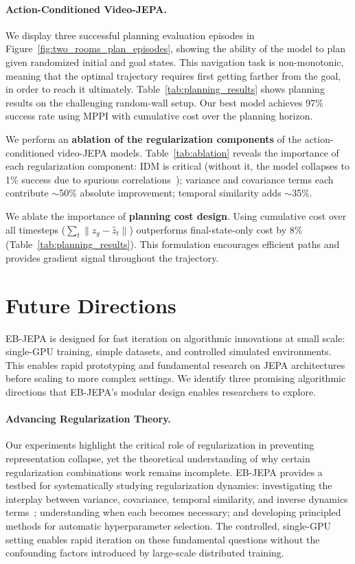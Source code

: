 \documentclass{article}
\begin{document}
\paragraph{Action-Conditioned Video-JEPA.}
We display three successful planning evaluation episodes in Figure~\ref{fig:two_rooms_plan_episodes}, showing the ability of the model to plan given randomized initial and goal states. This navigation task is non-monotonic, meaning that the optimal trajectory requires first getting farther from the goal, in order to reach it ultimately.
Table~\ref{tab:planning_results} shows planning results on the challenging random-wall setup.
Our best model achieves 97\% success rate using MPPI with cumulative cost over the planning horizon.

We perform an \textbf{ablation of the regularization components} of the action-conditioned video-JEPA models. Table~\ref{tab:ablation} reveals the importance of each regularization component: IDM is critical (without it, the model collapses to 1\% success due to spurious correlations~\citep{sobal2022jepaslowfeatures}); variance and covariance terms each contribute $\sim$50\% absolute improvement; temporal similarity adds $\sim$35\%.

We ablate the importance of \textbf{planning cost design}. Using cumulative cost over all timesteps ($\sum_t \|z_g - \hat{z}_t\|$) outperforms final-state-only cost by 8\% (Table~\ref{tab:planning_results}).
This formulation encourages efficient paths and provides gradient signal throughout the trajectory.

\section{Future Directions}

EB-JEPA is designed for fast iteration on algorithmic innovations at small scale: single-GPU training, simple datasets, and controlled simulated environments.
This enables rapid prototyping and fundamental research on JEPA architectures before scaling to more complex settings.
We identify three promising algorithmic directions that EB-JEPA's modular design enables researchers to explore.

\paragraph{Advancing Regularization Theory.}
Our experiments highlight the critical role of regularization in preventing representation collapse, yet the theoretical understanding of why certain regularization combinations work remains incomplete.
EB-JEPA provides a testbed for systematically studying regularization dynamics: investigating the interplay between variance, covariance, temporal similarity, and inverse dynamics terms~\citep{VICReg,balestriero2025lejepaprovablescalableselfsupervised,sobal2022jepaslowfeatures}; understanding when each becomes necessary; and developing principled methods for automatic hyperparameter selection.
The controlled, single-GPU setting enables rapid iteration on these fundamental questions without the confounding factors introduced by large-scale distributed training.
\end{document}
